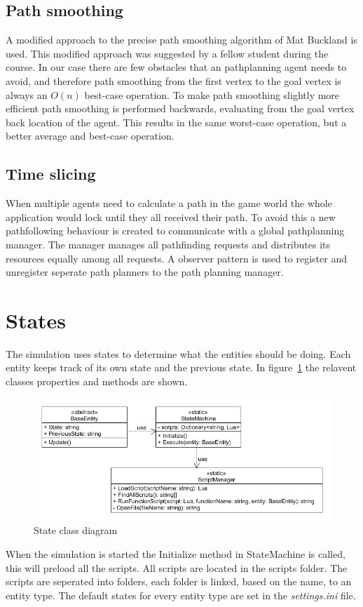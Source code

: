 \documentclass[10pt]{extarticle} %
\begin{document}
   \subsection {Path smoothing}
A modified approach to the precise path smoothing algorithm of Mat Buckland \cite{pgaie} is used. This modified approach was suggested by a fellow student during the course. In our case there are few obstacles that an pathplanning agent needs to avoid, and therefore path smoothing from the first vertex to the goal vertex is always an \(O(n)\) best-case operation. To make path smoothing slightly more efficient path smoothing is performed backwards, evaluating from the goal vertex back location of the agent. This results in the same worst-case operation, but a better average and best-case operation.
   \subsection {Time slicing}
  When multiple agents need to calculate a path in the game world the whole application would lock until they all received their path. To avoid this a new pathfollowing behaviour is created to communicate with a global pathplanning manager. The manager manages all pathfinding requests and distributes its resources equally among all requests. A observer pattern is used to register and unregister seperate path planners to the path planning manager.
   
 
   \newpage   
   \section {States}
   The simulation uses states to determine what the entities should be doing. Each entity keeps track of its own state and the previous state. In figure~\ref{fig:stateClassDiagram} the relavent classes properties and methods are shown. 
   \begin{figure}[h!]
   \includegraphics[width=\textwidth]{stateuml.png}
   \caption{State class diagram}
   \label{fig:stateClassDiagram}
   \end{figure}
   When the simulation is started the Initialize method in StateMachine is called, this will preload all the scripts. All scripts are located in the scripts folder. The scripts are seperated into folders, each folder is linked, based on the name, to an entity type.
   The default states for every entity type are set in the \emph{settings.ini} file.
\end{document}
